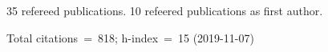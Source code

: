 35 refereed publications. 10 refeered publications as first author.

Total citations~=~818; h-index~=~15 (2019-11-07)